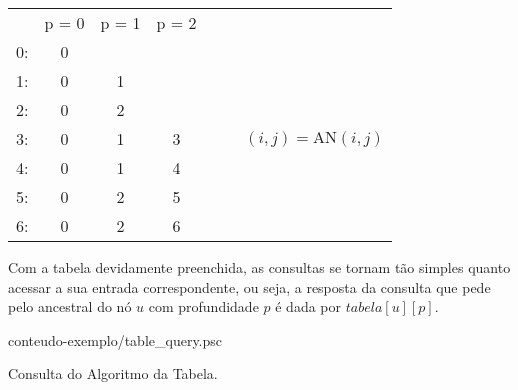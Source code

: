 \begin{minipage}[b]{0.49\textwidth}
  \centering
  \label{fig:a}
\end{minipage}
\hfill
\begin{minipage}[b]{0.49\textwidth}
  \centering
  \begin{tabular}[b]{c|cccccc}
    & p = 0 & p = 1 & p = 2 &  &    &                          \\
  \cline{1-4}
  0: & 0     &       &       &  & &                             \\
  1: & 0     & 1     &       &  & &                             \\
  2: & 0     & 2     &       &  & &                             \\
  3: & 0     & 1     & 3     &  & & $(i, j) = \mathrm{AN}(i, j)$ \\
  4: & 0     & 1     & 4     &  & &                            \\
  5: & 0     & 2     & 5     &  & &                             \\
  6: & 0     & 2     & 6     &  & &                             \\
  \end{tabular}
\end{minipage}

Com a tabela devidamente preenchida, as consultas se tornam tão simples quanto acessar
a sua entrada correspondente, ou seja, a resposta da consulta que pede pelo ancestral
do nó $u$ com profundidade $p$ é dada por $tabela[u][p]$. 

\begin{program}[h!]
  
  {conteudo-exemplo/table_query.psc}

  \caption{Consulta do Algoritmo da Tabela.\label{prog:tablequery}}
\end{program}

